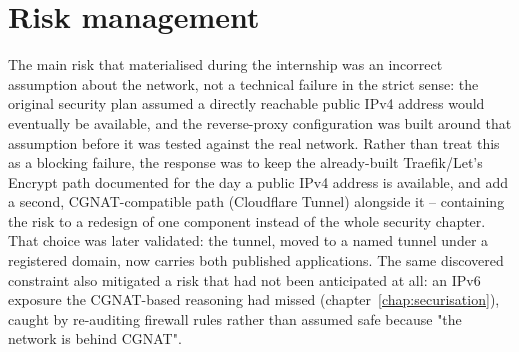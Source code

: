 \section{Risk management}
The main risk that materialised during the internship was an incorrect assumption about the network, not a technical failure in the strict sense: the original security plan assumed a directly reachable public IPv4 address would eventually be available, and the reverse-proxy configuration was built around that assumption before it was tested against the real network. Rather than treat this as a blocking failure, the response was to keep the already-built Traefik/Let's Encrypt path documented for the day a public IPv4 address is available, and add a second, CGNAT-compatible path (Cloudflare Tunnel) alongside it -- containing the risk to a redesign of one component instead of the whole security chapter. That choice was later validated: the tunnel, moved to a named tunnel under a registered domain, now carries both published applications. The same discovered constraint also mitigated a risk that had not been anticipated at all: an IPv6 exposure the CGNAT-based reasoning had missed (chapter~\ref{chap:securisation}), caught by re-auditing firewall rules rather than assumed safe because "the network is behind CGNAT".

\clearpage
